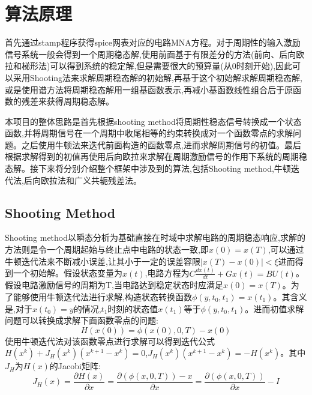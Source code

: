 \documentclass[12pt]{article}
\begin{document}
\begin{sloppypar}

\section{算法原理}

\qquad 首先通过stamp程序获得spice网表对应的电路MNA方程。对于周期性的输入激励信号系统一般会得到一个周期稳态解,使用前面基于有限差分的方法(前向、后向欧拉和梯形法)可以得到系统的稳定解,但是需要很大的预算量(从0时刻开始),因此可以采用Shooting法来求解周期稳态解的初始解,再基于这个初始解求解周期稳态解,或是使用谱方法将周期稳态解用一组基函数表示,再减小基函数线性组合后于原函数的残差来获得周期稳态解。

\qquad 本项目的整体思路是首先根据shooting method将周期性稳态信号转换成一个状态函数,并将周期信号在一个周期中收尾相等的约束转换成对一个函数零点的求解问题。之后使用牛顿法来迭代前面构造的函数零点,进而求解周期信号的初值。最后根据求解得到的初值再使用后向欧拉来求解在周期激励信号的作用下系统的周期稳态解。接下来将分别介绍整个框架中涉及到的算法,包括Shooting method,牛顿迭代法,后向欧拉法和广义共轭残差法。\par


\subsection{Shooting Method}
\qquad Shooting method以瞬态分析为基础直接在时域中求解电路的周期稳态响应,求解的方法则是令一个周期起始与终止点中电路的状态一致,即$x(0) = x(T)$,可以通过牛顿迭代法来不断减小误差,让其小于一定的误差容限$|x(T)-x(0)| < \xi$进而得到一个初始解。假设状态变量为$x(t)$,电路方程为$C\frac{dx(t)}{dt}+Gx(t)=BU(t)$。假设电路激励信号的周期为T,当电路达到稳定状态时应满足$x(0) = x(T)$。为了能够使用牛顿迭代法进行求解,构造状态转换函数$\phi(y,t_0,t_1) = x(t_1)$。其含义是,对于$x(t_0)=y$的情况,$t_1$时刻的状态值$x(t_1)$等于$\phi(y,t_0,t_1)$。进而初值求解问题可以转换成求解下面函数零点的问题:
\begin{equation}
  H(x(0)) = \phi(x(0),0,T) - x(0)
\end{equation}
\qquad 使用牛顿迭代法对该函数零点进行求解可以得到迭代公式$H\left(x^k\right)+J_H\left(x^k\right)\left(x^{k+1}-x^k\right)=0$,$J_H\left(x^k\right)\left(x^{k+1}-x^k\right)=-H\left(x^k\right)$。其中$J_H$为$H(x)$的Jacobi矩阵:
\begin{equation}
  J_H(x)=\frac{\partial H(x)}{\partial x}=\frac{\partial(\phi(x, 0, T))-x}{\partial x}=\frac{\partial(\phi(x, 0, T))}{\partial x}-I
\end{equation}


\end{sloppypar}
\end{document}
